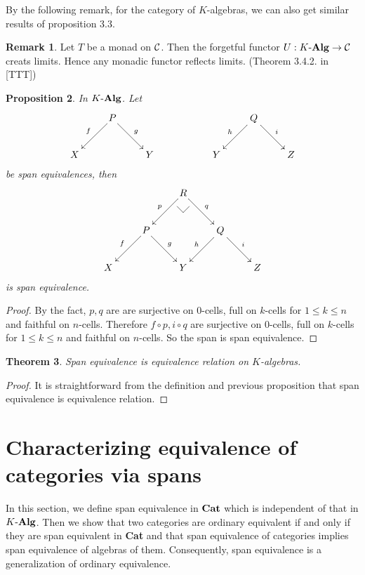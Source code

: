 \documentclass[12pt]{article}
\makeatletter
\theoremstyle{plain}
\newtheorem{theorem}{Theorem}[section]
\newtheorem{proposition}[theorem]{Proposition}
\theoremstyle{definition}
\newtheorem{remark}[theorem]{Remark}
\newcommand{\pullbackmark}[2]{\save ;p+<.8pc,0pc>:(0,-1)::%
(#1) *{\phantom{Z}} %
;p+(#2)-(0,0) **@{-}%
;p-(#1)+(0,0) *{\phantom{Z}} **@{-} \restore}
\makeatother
\begin{document}
By the following remark, for the category of $K$-algebras, we can also get similar results of proposition 3.3.

\begin{remark}
Let $T$ be a monad on ${\cal C}$. Then the forgetful functor $U:K \mathchar`- {\bf Alg} \rightarrow {\cal C}$ creats limits. Hence any monadic functor reflects limits. (Theorem 3.4.2. in [TTT])
\end{remark} 


\begin{proposition}
In $K \mathchar`- {\bf Alg}$. Let
\[ \xymatrix{
 & \ar[ld]_f P \ar[rd]^g &  & & & \ar[ld]_h Q \ar[rd]^i & \\
X & & Y &  & Y & & Z 
} \]
be span equivalences, then
\[ \xymatrix{ 
 & & \ar[ld]_p R \pullbackmark{-1,1}{1,1} \ar[rd]^q & & \\
 & \ar[ld]_f P \ar[rd]^g &  & \ar[ld]_h Q \ar[rd]^i & \\
X & & Y & & Z 
} \]
is span equivalence.
\end{proposition}

\begin{proof}  By the fact, $p,q$ are are surjective on $0$-cells, full on $k$-cells for $1 \leq k \leq n$ and faithful on $n$-cells. Therefore $f \circ p , i \circ q$ are surjective on $0$-cells, full on $k$-cells for $1 \leq k \leq n$ and faithful on $n$-cells. So the span is span equivalence.
\end{proof}

\begin{theorem}
Span equivalence is equivalence relation on $K$-algebras.
\end{theorem}

\begin{proof} It is straightforward from the definition and previous proposition that span equivalence is equivalence relation.\end{proof}


\section{Characterizing equivalence of categories via spans}
In this section, we define span equivalence in ${\bf Cat}$ which is independent of that in $K \mathchar`- {\bf Alg}$. Then we show that two categories are ordinary equivalent if and only if they are span equivalent in {\bf Cat} and that span equivalence of categories implies span equivalence of algebras of them. Consequently, span equivalence is a generalization of ordinary equivalence.
\end{document}
